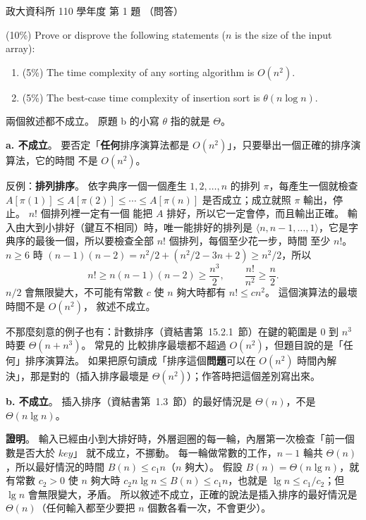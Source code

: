 \begin{pastexam}[label={px:nccu-110-dsa-01}]{政大資科所 110 學年度 第 1 題}
（問答）

(10\%) Prove or disprove the following statements ($n$ is the size of the input array):
\begin{enumerate}[label=\alph*.]
\item (5\%) The time complexity of any sorting algorithm is $O(n^2)$.
\item (5\%) The best-case time complexity of insertion sort is $\theta(n\log n)$.
\end{enumerate}
\end{pastexam}

\begin{pastsoln}
兩個敘述都不成立。 原題 b 的小寫 $\theta$ 指的就是 $\Theta$。

\textbf{a. 不成立}。 要否定「\textbf{任何}排序演算法都是 $O(n^2)$」，只要舉出一個正確的排序演算法，它的時間
不是 $O(n^2)$。

反例：\textbf{排列排序}。 依字典序一個一個產生 $1, 2, \ldots, n$ 的排列 $\pi$，每產生一個就檢查
$A[\pi(1)] \le A[\pi(2)] \le \cdots \le A[\pi(n)]$ 是否成立；成立就照 $\pi$ 輸出，停止。 $n!$ 個排列裡一定有一個
能把 $A$ 排好，所以它一定會停，而且輸出正確。 輸入由大到小排好（鍵互不相同）時，唯一能排好的排列是
$\langle n, n-1, \ldots, 1 \rangle$，它是字典序的最後一個，所以要檢查全部 $n!$ 個排列，每個至少花一步，時間
至少 $n!$。 $n \ge 6$ 時 $(n-1)(n-2) = n^2/2 + (n^2/2 - 3n + 2) \ge n^2/2$，所以
\[
n! \ge n(n-1)(n-2) \ge \frac{n^3}{2}, \qquad \frac{n!}{n^2} \ge \frac{n}{2}.
\]
$n/2$ 會無限變大，不可能有常數 $c$ 使 $n$ 夠大時都有 $n! \le cn^2$。 這個演算法的最壞時間不是 $O(n^2)$，
敘述不成立。

不那麼刻意的例子也有：計數排序（資結書第~15.2.1~節）在鍵的範圍是 $0$ 到 $n^3$ 時要 $\Theta(n + n^3)$。 常見的
比較排序最壞都不超過 $O(n^2)$，但題目說的是「任何」排序演算法。 如果把原句讀成「排序這個\textbf{問題}可以在
$O(n^2)$ 時間內解決」，那是對的（插入排序最壞是 $\Theta(n^2)$）；作答時把這個差別寫出來。

\textbf{b. 不成立}。 插入排序（資結書第~1.3~節）的最好情況是 $\Theta(n)$，不是 $\Theta(n \lg n)$。

\textbf{證明}。 輸入已經由小到大排好時，外層迴圈的每一輪，內層第一次檢查「前一個數是否大於 $\mathit{key}$」
就不成立，不挪動。 每一輪做常數的工作，$n - 1$ 輪共 $\Theta(n)$，所以最好情況的時間 $B(n) \le c_1 n$（$n$ 夠大）。
假設 $B(n) = \Theta(n \lg n)$，就有常數 $c_2 > 0$ 使 $n$ 夠大時 $c_2 n \lg n \le B(n) \le c_1 n$，也就是
$\lg n \le c_1 / c_2$；但 $\lg n$ 會無限變大，矛盾。 所以敘述不成立，正確的說法是插入排序的最好情況是
$\Theta(n)$（任何輸入都至少要把 $n$ 個數各看一次，不會更少）。
\end{pastsoln}
